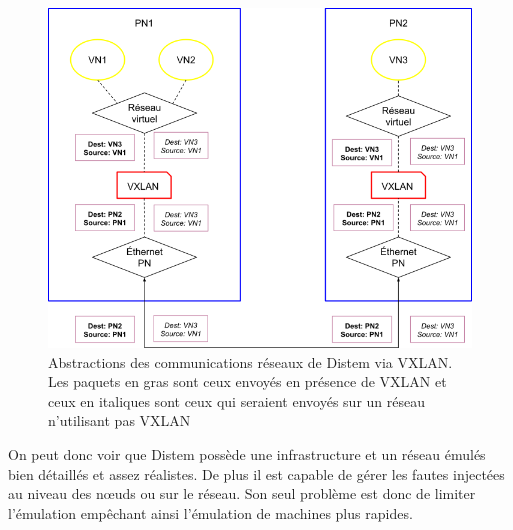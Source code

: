 \begin{figure}[H]
  \centering
  \includegraphics[scale=0.5]{Pictures/png/Distem_VXLAN}
  \caption{Abstractions des communications réseaux de Distem via VXLAN. Les paquets en gras sont ceux envoyés en présence de VXLAN et ceux en italiques sont ceux qui seraient envoyés sur un réseau n'utilisant pas VXLAN}
  \label{Distem_VXLAN}
\end{figure}

On peut donc voir que Distem possède une infrastructure et un réseau émulés bien détaillés et assez réalistes. De plus il est capable de gérer les fautes injectées au niveau des n\oe uds ou sur le réseau. Son seul problème est donc de limiter l'émulation empêchant ainsi l'émulation de machines plus rapides. 

